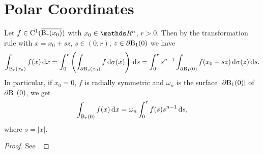 

\section{Polar Coordinates}
\label{sec:polar}

Let $f \in \mathrm{C}^1(\overline{\mathrm{B}_r(x_0)})$ with $x_0 \in \R^n$, $r > 0$. Then by the transformation rule with $x = x_0 + sz$, $s \in (0,r)$, $z \in \partial \mathrm{B}_1(0)$ we have
$$
\int_{\mathrm{B}_r(x_0)} f(x) \, {\operatorname{d}\!{x}} = \int_0^r \left( \int_{\partial \mathrm{B}_s(x_0)} f \, {\operatorname{d}\!{\sigma}}(x) \right) \, {\operatorname{d}\!{s}} = \int_0^r s^{n - 1} \int_{\partial \mathrm{B}_1(0)} f(x_0 + sz) \, {\operatorname{d}\!{\sigma}}(z) \, {\operatorname{d}\!{s}}.
$$
In particular, if $x_0 = 0$, $f$ is radially symmetric and $\omega_n$ is the surface $|\partial \mathrm{B}_1(0)|$ of $\partial \mathrm{B}_1(0)$, we get
$$
\int_{\mathrm{B}_r(0)} f(x) \, {\operatorname{d}\!{x}} = \omega_n \int_0^r f(s) s^{n - 1} \, {\operatorname{d}\!{s}},
$$
where $s = |x|$.

\begin{proof}
  See \cite[Appendix C.3]{evans2010partial}.
\end{proof}
